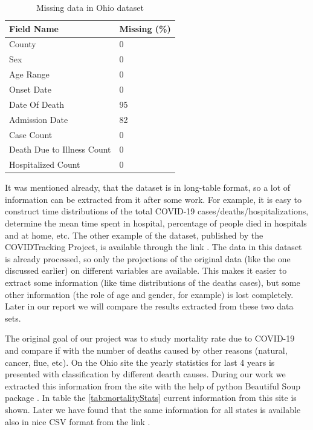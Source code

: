 \documentclass[conference]{IEEEtran}
\begin{document}
\begin{table}
  \centering
  \begin{tabular}{ll}
    \toprule
    Field Name & Missing (\%) \\
    \midrule
    County & 0  \\
    Sex & 0  \\
    Age Range & 0  \\
               Onset Date & 0  \\
               Date Of Death & 95 \\
               Admission Date &  82 \\
               Case Count & 0  \\
               Death Due to Illness Count & 0 \\
               Hospitalized Count & 0  \\
    \bottomrule
  \end{tabular}
  \caption{Missing data in Ohio dataset}
  \label{tab:Ohio:missing}
\end{table}

It was mentioned already, that the dataset is in long-table format, so a lot of information can be extracted from it after some work. For example, it is easy to construct time distributions of the total COVID-19 cases/deaths/hospitalizations, determine the mean time spent in hospital, percentage of people died in hospitals and at home, etc. The other example of the dataset, published by the COVIDTracking Project, is available through the link \cite{covid19tracking_covid_nodate}. The data in this dataset is already processed, so only the projections of the original data (like the one discussed earlier) on different variables are available. This makes it easier to extract some information (like time distributions of the deaths cases), but some other information (the role of age and gender, for example) is lost completely. Later in our report we will compare the results extracted from these two data sets.

The original goal of our project was to study mortality rate due to COVID-19 and compare if with the number of deaths caused by other reasons (natural, cancer, flue, etc). On the Ohio site \cite{statistics_stats_nodate} the yearly statistics for last 4 years is presented with classification by different dearth causes. During our work we extracted this information from the site with the help of python Beautiful Soup package \cite{team_beautiful_nodate}. In table the \ref{tab:mortalityStats} current information from this site is shown. Later we have found that the same information for all states is available also in nice CSV format from the link \cite{cdc_weekly_nodate}. 
\end{document}
